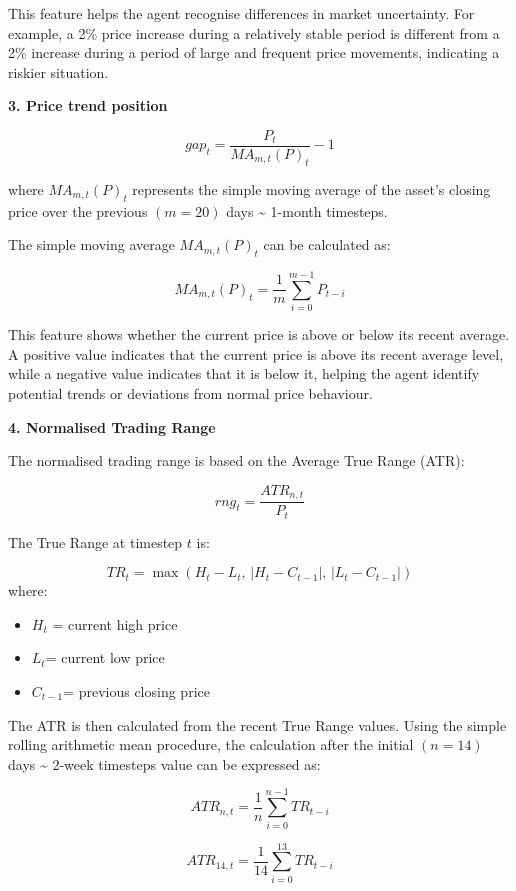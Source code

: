 This feature helps the agent recognise differences in market
uncertainty. For example, a 2\% price increase during a relatively
stable period is different from a 2\% increase during a period of large
and frequent price movements, indicating a riskier situation.

\textbf{3. Price trend position}

\[gap_{t} = \frac{P_{t}}{MA_{m,t}(P)_{t}} - 1\]

where \({MA}_{m,t}(P)_{t}\) represents the simple moving average of the
asset's closing price over the previous \((m = 20)\) days
\textasciitilde{} 1-month timesteps.

The simple moving average \({MA}_{m,t}(P)_{t}\) can be calculated as:

\[{MA}_{m,t}(P)_{t} = \frac{1}{m}\sum_{i = 0}^{m - 1}P_{t - i}\]

This feature shows whether the current price is above or below its
recent average. A positive value indicates that the current price is
above its recent average level, while a negative value indicates that it
is below it, helping the agent identify potential trends or deviations
from normal price behaviour.

\textbf{4. Normalised Trading Range}

The normalised trading range is based on the Average True Range (ATR):

\[rng_{t} = \frac{ATR_{n,t}}{P_{t}}\]

The True Range at timestep \(t\) is:

\[TR_{t} = \max\left( H_{t} - L_{t},\,\left| H_{t} - C_{t - 1} \right|,\,\left| L_{t} - C_{t - 1} \right| \right)
\]where:

\begin{itemize}
\item
  \(H_{t}\) = current high price
\item
  \(L_{t}\)= current low price
\item
  \(C_{t - 1}\)= previous closing price
\end{itemize}

The ATR is then calculated from the recent True Range values. Using the
simple rolling arithmetic mean procedure, the calculation after the
initial \((n = 14)\) days \textasciitilde{} 2-week timesteps value can
be expressed as:

\[ATR_{n,t} = \frac{1}{n}\sum_{i = 0}^{n - 1}TR_{t - i}\]

\[ATR_{14,t} = \frac{1}{14}\sum_{i = 0}^{13}TR_{t - i}\]

